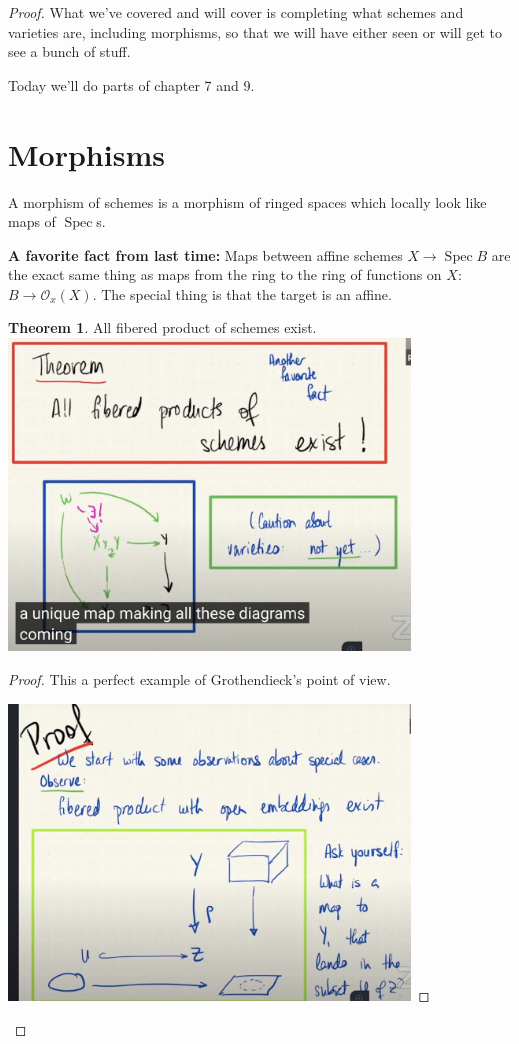 \documentclass{book}
\renewcommand{\O}{\ensuremath{\mathcal{O}}}
\newcommand{\spec}{\operatorname{Spec}}
\theoremstyle{definition}
\newtheorem{theorem}{Theorem}
\begin{document}
\begin{proof}
What we've covered and will cover is completing what schemes and varieties are,
including morphisms, so that we will have either seen or will get to see
a bunch of stuff.

Today we'll do parts of chapter 7 and 9.

\section{Morphisms}
A morphism of schemes is a morphism of ringed spaces which locally look like
maps of $\spec$s.

\textbf{A favorite fact from last time:} Maps between affine schemes
$X \rightarrow \spec B$ are the exact same thing as maps from the ring
to the ring of functions on $X$: $B \rightarrow \O_x(X)$. The special thing
is that the target is an affine.

\begin{theorem}
All fibered product of schemes exist.
\includegraphics[width=0.8\textwidth]{all-fibered-products-exist.png}
\end{theorem}
\begin{proof}
This a perfect example of Grothendieck's point of view.

\includegraphics[width=0.8\textwidth]{all-fibered-products-exist-proof.png}



\end{proof}
\end{proof}
\end{document}
